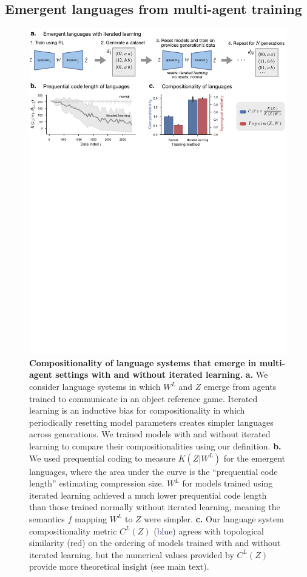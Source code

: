 \documentclass{article}
\begin{document}
\subsection{Emergent languages from multi-agent training}
\label{sec:emergent}

\begin{figure}[ht]
    \centering
    \includegraphics[width=\linewidth]{figures/emergent.pdf}
    \caption{\textbf{Compositionality of language systems that emerge in multi-agent settings with and without iterated learning.} \textbf{a.} We consider language systems in which $W^L$ and $Z$ emerge from agents trained to communicate in an object reference game. Iterated learning is an inductive bias for compositionality in which periodically resetting model parameters creates simpler languages across generations. We trained models with and without iterated learning to compare their compositionalities using our definition. \textbf{b.} We used prequential coding to measure $K(Z | W^L)$ for the emergent languages, where the area under the curve is the ``prequential code length'' estimating compression size. $W^L$ for models trained using iterated learning achieved a much lower prequential code length than those trained normally without iterated learning, meaning the semantics $f$ mapping $W^L$ to $Z$ were simpler. \textbf{c.} Our language system compositionality metric $C^L(Z)$ (\textcolor{MidnightBlue}{blue}) agrees with topological similarity (\textcolor{BrickRed}{red}) on the ordering of models trained with and without iterated learning, but the numerical values provided by $C^L(Z)$ provide more theoretical insight (see main text).}
    \label{fig:emergent}
\end{figure}
\end{document}
